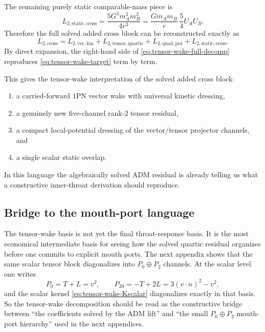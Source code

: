 \documentclass[11pt]{article}
\newcommand{\OnePN}{\mathrm{1PN}}
\newcommand{\ADM}{\mathrm{ADM}}
\begin{document}
The remaining purely static comparable-mass piece is
\begin{equation}
L_{2,\mathrm{static,cross}}
=
\frac{5G^3m_A^2m_B^2}{4r^3}
=
\frac{Gm_A m_B}{r}\,\frac54 U_AU_B.
\label{eq:tensor-wake-static-cross}
\end{equation}
Therefore the full solved added cross block can be reconstructed exactly as
\begin{equation}
L_{2,\mathrm{cross}}
=
L_{2,\mathrm{vec,kin}}
+L_{2,\mathrm{tensor,quartic}}
+L_{2,\mathrm{quad,pot}}
+L_{2,\mathrm{static,cross}}.
\label{eq:tensor-wake-full-decomp}
\end{equation}
By direct expansion, the right-hand side of
\cref{eq:tensor-wake-full-decomp} reproduces \cref{eq:tensor-wake-target} term by term.

This gives the tensor-wake interpretation of the solved added cross block:
\begin{enumerate}[leftmargin=1.5em]
  \item a carried-forward \(\OnePN\) vector wake with universal kinetic dressing,
  \item a genuinely new five-channel rank-\(2\) tensor residual,
  \item a compact local-potential dressing of the vector/tensor projector channels, and
  \item a single scalar static overlap.
\end{enumerate}
In this language the algebraically solved \(\ADM\) residual is already telling us what a
constructive inner-throat derivation should reproduce.

\subsection{Bridge to the mouth-port language}
\label{app:tensor-wake-bridge}

The tensor-wake basis is not yet the final throat-response basis.
It is the most economical intermediate basis for seeing how the solved quartic residual
organizes before one commits to explicit mouth ports.
The next appendix shows that the same scalar tensor block diagonalizes into
\(P_0\oplus P_2\) channels.
At the scalar level one writes
\begin{equation}
P_0=T+L=v^2,
\qquad
P_{20}=-T+2L=3(v\cdot n)^2-v^2,
\label{eq:tensor-wake-P0P20}
\end{equation}
and the scalar kernel \cref{eq:tensor-wake-Kscalar} diagonalizes exactly in that basis.
So the tensor-wake decomposition should be read as the constructive bridge between
``the coefficients solved by the \(\ADM\) lift'' and ``the small
\(P_0\oplus P_2\) mouth-port hierarchy'' used in the next appendices.
\end{document}
